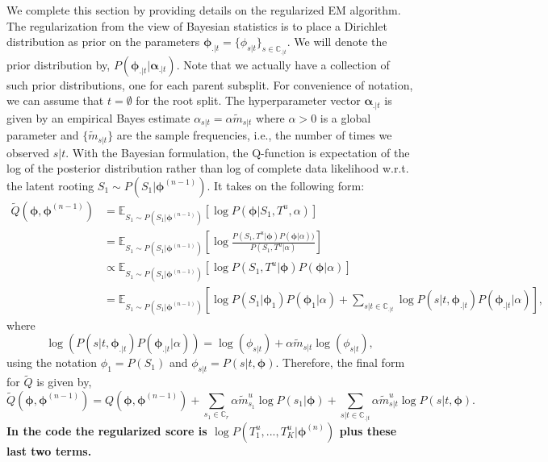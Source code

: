 \documentclass{article}
\newcommand{\E}{\mathbb{E}}
\begin{document}
We complete this section by providing details on the regularized EM algorithm.
The regularization from the view of Bayesian statistics is to place a Dirichlet distribution as prior on the parameters $\bm{\phi}_{.|t} = \{\phi_{s|t}\}_{s \in \mathbb{C}_{.|t}}$.
We will denote the prior distribution by, $P(\bm{\phi}_{.|t} | \bm{\alpha}_{.|t})$.
Note that we actually have a collection of such prior distributions, one for each parent subsplit.
For convenience of notation, we can assume that $t = \emptyset$ for the root split.
The hyperparameter vector $\bm{\alpha}_{.|t}$ is given by an empirical Bayes estimate $\alpha_{s|t} = \alpha \tilde{m}_{s|t}$ where $\alpha > 0$ is a global parameter and $\{\tilde{m}_{s|t}\}$ are the sample frequencies, i.e., the number of times we observed $s|t$.
With the Bayesian formulation, the Q-function is expectation of the log of the posterior distribution rather than log of complete data likelihood w.r.t. the latent rooting $S_1 \sim P(S_1 | \bm{\phi}^{(n-1)})$.
It takes on the following form:
\begin{align*}
    \tilde{Q}(\bm{\phi}, \bm{\phi}^{(n-1)}) &= \E_{S_1 \sim P(S_1 | \bm{\phi}^{(n-1)})}\left[ \log P(\bm{\phi} | S_1, T^u, \alpha) \right] \\
    &= \E_{S_1 \sim P(S_1 | \bm{\phi}^{(n-1)})}\left[ \log \frac{P(S_1, T^u | \bm{\phi}) P(\bm{\phi} | \alpha))}{P(S_1, T^u | \alpha)} \right] \\
    &\propto \E_{S_1 \sim P(S_1 | \bm{\phi}^{(n-1)})}\left[ \log P(S_1, T^u | \bm{\phi}) P(\bm{\phi} | \alpha) \right] \\
    &= \E_{S_1 \sim P(S_1 | \bm{\phi}^{(n-1)})}\left[ \log P(S_1 | \bm{\phi}_{1}) P(\bm{\phi}_1 | \alpha) + \sum\limits_{s|t \in \mathbb{C}_{.|t}} \log P(s | t, \bm{\phi}_{.|t}) P(\bm{\phi}_{.|t} | \alpha) \right],
\end{align*}
where
\begin{equation*}
    \log \left( P(s | t, \bm{\phi}_{.|t})P(\bm{\phi}_{.|t} | \alpha) \right) = \log(\phi_{s|t}) + \alpha \tilde{m}_{s|t} \log(\phi_{s|t}),
\end{equation*}
using the notation $\phi_1 = P(S_1)$ and $\phi_{s|t} = P(s | t, \bm{\phi})$.
Therefore, the final form for $\tilde{Q}$ is given by,
\begin{equation*}
    \tilde{Q}(\bm{\phi}, \bm{\phi}^{(n-1)}) = Q(\bm{\phi}, \bm{\phi}^{(n-1)}) + \sum\limits_{s_1 \in \mathbb{C}_r} \alpha \tilde{m}_{s_1}^u \log P(s_1 | \bm{\phi}) + \sum\limits_{s|t \in \mathbb{C}_{.|t}} \alpha \tilde{m}_{s|t}^u \log P(s | t, \bm{\phi}).
\end{equation*}
\textbf{In the code the regularized score is $\log P(T^u_1, ..., T^u_K | \bm{\phi}^{(n)})$ plus these last two terms.}
\end{document}
